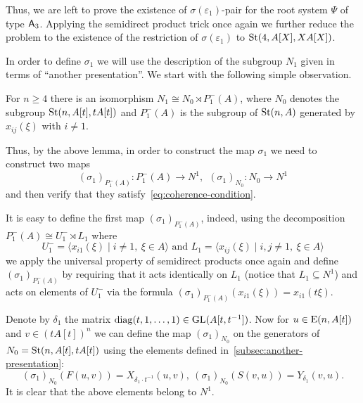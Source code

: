 Thus, we are left to prove the existence of $\sigma(\varepsilon_1)$-pair for the root system $\Psi$ of type $\mathsf{A}_3$.
Applying the semidirect product trick once again we further reduce the problem to the existence of the restriction of $\sigma(\varepsilon_1)$ to $\operatorname{St}(4, A[X], XA[X])$.

In order to define $\sigma_1$ we will use the description of the subgroup $N_1$ given in terms of ``another presentation''.
We start with the following simple observation.
\begin{lemma}
    \label{lem:n1-decomp} For $n\geq 4$ there is an isomorphism $N_1 \cong N_{0} \rtimes P_1^-(A)$,
    where $N_{0}$ denotes the subgroup $\operatorname{St}(n, A[t], tA[t])$ and $P_1^-(A)$ is the subgroup of $\operatorname{St}(n, A)$ generated by $x_{ij}(\xi)$ with $i\neq 1$.
\end{lemma}

Thus, by the above lemma, in order to construct the map $\sigma_1$ we need to construct two maps
\[ (\sigma_1)_{P_1^-(A)} \colon P_1^-(A) \to N^1, \ \ (\sigma_1)_{N_{0}} \colon N_{0} \to N^1\]
and then verify that they satisfy~\eqref{eq:coherence-condition}.

It is easy to define the first map $(\sigma_1)_{P_1^-(A)}$, indeed, using the decomposition $P_1^-(A) \cong U^-_1 \rtimes L_1$ where %
\[U^-_1 = \langle x_{i1}(\xi) \mid i\neq 1,\ \xi\in A \rangle \text{ and } L_1 = \langle x_{ij}(\xi) \mid i,  j \neq 1,\ \xi\in A\rangle \]
we apply the universal property of semidirect products once again
and define $(\sigma_1)_{P_1^-(A)}$ by requiring that it acts identically on $L_1$ (notice that $L_1 \subseteq N^1$) %
and acts on elements of $U^-_1$ via the formula $(\sigma_1)_{P_1^-(A)}(x_{i1}(\xi))= x_{i1}(t\xi)$.


Denote by $\delta_1$ the matrix $\mathrm{diag}(t, 1, \ldots, 1) \in \operatorname{GL}(A[t, t^{-1}])$.
Now for $u \in \operatorname{E}(n, A[t])$ and $v \in (tA[t])^n$ we can define the map $(\sigma_1)_{N_0}$ on the generators of $N_{0}=\operatorname{St}(n, A[t], tA[t])$
using the elements defined in~\cref{subsec:another-presentation}:
\begin{equation*}
(\sigma_1)
    _{N_0} (F(u, v)) = X_{\delta_1 \cdot t^{-1}}(u, v),\ (\sigma_1)_{N_0} (S(v, u)) = Y_{\delta_1}(v, u).
\end{equation*}
It is clear that the above elements belong to $N^1$.

